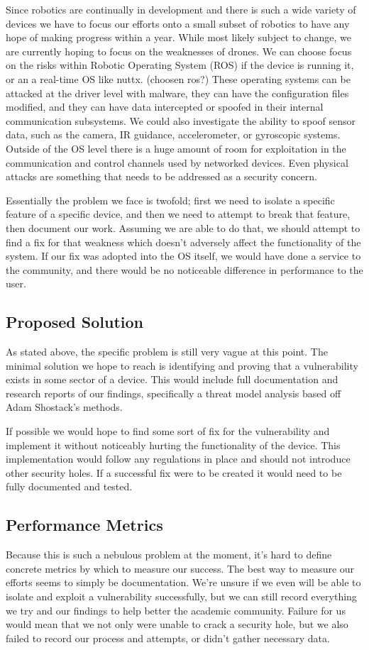 \documentclass[IEEEtran,letterpaper,10pt,titlepage,draftclsnofoot,onecolumn]{article}
\begin{document}
Since robotics are continually in development and there is such a wide variety of devices we have to focus our efforts onto a small subset of robotics to have any hope of making progress within a year. 
While most likely subject to change, we are currently hoping to focus on the weaknesses of drones.
We can choose focus on the risks within Robotic Operating System (ROS) if the device is running it, or an a real-time OS like nuttx. (choosen ros?)
These operating systems can be attacked at the driver level with malware, they can have the configuration files modified, and they can have data intercepted or spoofed in their internal communication subsystems.
We could also investigate the ability to spoof sensor data, such as the camera, IR guidance, accelerometer, or gyroscopic systems. 
Outside of the OS level there is a huge amount of room for exploitation in the communication and control channels used by networked devices. 
Even physical attacks are something that needs to be addressed as a security concern.

Essentially the problem we face is twofold; first we need to isolate a specific feature of a specific device, and then we need to attempt to break that feature, then document our work.
Assuming we are able to do that, we should attempt to find a fix for that weakness which doesn't adversely affect the functionality of the system.
If our fix was adopted into the OS itself, we would have done a service to the community, and there would be no noticeable difference in performance to the user.

\subsection*{Proposed Solution}
As stated above, the specific problem is still very vague at this point.
The minimal solution we hope to reach is identifying and proving that a vulnerability exists in some sector of a device.
This would include full documentation and research reports of our findings, specifically a threat model analysis based off Adam Shostack's methods. \cite[p.203]{TMDS}

If possible we would hope to find some sort of fix for the vulnerability and implement it without noticeably hurting the functionality of the device.
This implementation would follow any regulations in place and should not introduce other security holes.
If a successful fix were to be created it would need to be fully documented and tested.

\subsection*{Performance Metrics}
Because this is such a nebulous problem at the moment, it's hard to define concrete metrics by which to measure our success.
The best way to measure our efforts seems to simply be documentation.
We're unsure if we even will be able to isolate and exploit a vulnerability successfully, but we can still record everything we try and our findings to help better the academic community. 
Failure for us would mean that we not only were unable to crack a security hole, but we also failed to record our process and attempts, or didn't gather necessary data.




\end{document}
